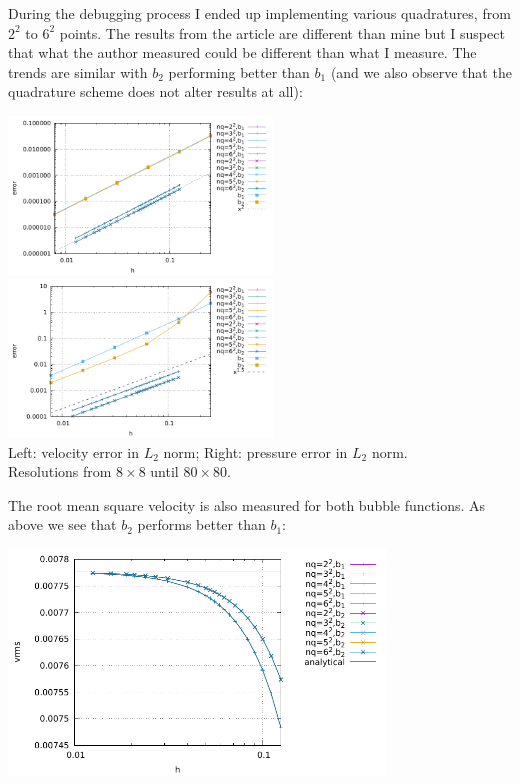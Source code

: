 During the debugging process I ended up 
implementing various quadratures, from $2^2$ to $6^2$ points. 
The results from the article are different than mine but I suspect that what the 
author measured could be different than what I measure. 
The trends are similar with $b_2$ performing better than $b_1$ (and 
we also observe that the quadrature scheme does not alter results at all): 

\begin{center}
\includegraphics[width=7cm]{python_codes/fieldstone_72/results/mms/errors_v}
\includegraphics[width=7cm]{python_codes/fieldstone_72/results/mms/errors_p}\\
{\captionfont Left: velocity error in $L_2$ norm; Right: pressure error in $L_2$ norm.\\
Resolutions from $8\times8$ until $80\times80$.}
\end{center}

The root mean square velocity is also measured for both bubble functions.
As above we see that $b_2$ performs better than $b_1$:
\begin{center}
\includegraphics[width=10cm]{python_codes/fieldstone_72/results/mms/vrms}
\end{center}

